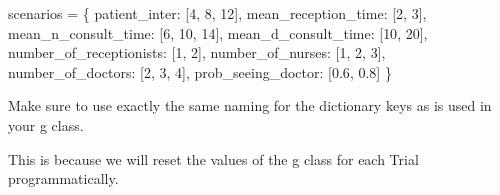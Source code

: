 \documentclass[
  letterpaper,
  DIV=11,
  numbers=noendperiod]{scrreprt}
\newenvironment{Shaded}{\begin{snugshade}}{\end{snugshade}}
\newcommand{\DecValTok}[1]{\textcolor[rgb]{0.68,0.00,0.00}{#1}}
\newcommand{\FloatTok}[1]{\textcolor[rgb]{0.68,0.00,0.00}{#1}}
\newcommand{\NormalTok}[1]{\textcolor[rgb]{0.00,0.23,0.31}{#1}}
\newcommand{\OperatorTok}[1]{\textcolor[rgb]{0.37,0.37,0.37}{#1}}
\newcommand{\StringTok}[1]{\textcolor[rgb]{0.13,0.47,0.30}{#1}}
\begin{document}
\begin{Shaded}
\begin{Highlighting}[]
\NormalTok{scenarios }\OperatorTok{=}\NormalTok{ \{}
    \StringTok{\textquotesingle{}patient\_inter\textquotesingle{}}\NormalTok{: [}\DecValTok{4}\NormalTok{, }\DecValTok{8}\NormalTok{, }\DecValTok{12}\NormalTok{],}
    \StringTok{\textquotesingle{}mean\_reception\_time\textquotesingle{}}\NormalTok{: [}\DecValTok{2}\NormalTok{, }\DecValTok{3}\NormalTok{],}
    \StringTok{\textquotesingle{}mean\_n\_consult\_time\textquotesingle{}}\NormalTok{: [}\DecValTok{6}\NormalTok{, }\DecValTok{10}\NormalTok{, }\DecValTok{14}\NormalTok{],}
    \StringTok{\textquotesingle{}mean\_d\_consult\_time\textquotesingle{}}\NormalTok{: [}\DecValTok{10}\NormalTok{, }\DecValTok{20}\NormalTok{],}
    \StringTok{\textquotesingle{}number\_of\_receptionists\textquotesingle{}}\NormalTok{: [}\DecValTok{1}\NormalTok{, }\DecValTok{2}\NormalTok{],}
    \StringTok{\textquotesingle{}number\_of\_nurses\textquotesingle{}}\NormalTok{: [}\DecValTok{1}\NormalTok{, }\DecValTok{2}\NormalTok{, }\DecValTok{3}\NormalTok{],}
    \StringTok{\textquotesingle{}number\_of\_doctors\textquotesingle{}}\NormalTok{: [}\DecValTok{2}\NormalTok{, }\DecValTok{3}\NormalTok{, }\DecValTok{4}\NormalTok{],}
    \StringTok{\textquotesingle{}prob\_seeing\_doctor\textquotesingle{}}\NormalTok{: [}\FloatTok{0.6}\NormalTok{, }\FloatTok{0.8}\NormalTok{]}
\NormalTok{\}}
\end{Highlighting}
\end{Shaded}

\begin{tcolorbox}[enhanced jigsaw, rightrule=.15mm, colback=white, colframe=quarto-callout-tip-color-frame, colbacktitle=quarto-callout-tip-color!10!white, toprule=.15mm, coltitle=black, opacityback=0, titlerule=0mm, bottomtitle=1mm, breakable, title=\textcolor{quarto-callout-tip-color}{\faLightbulb}\hspace{0.5em}{Tip}, opacitybacktitle=0.6, toptitle=1mm, arc=.35mm, bottomrule=.15mm, leftrule=.75mm, left=2mm]

Make sure to use exactly the same naming for the dictionary keys as is
used in your g class.

This is because we will reset the values of the g class for each Trial
programmatically.

\end{tcolorbox}
\end{document}
